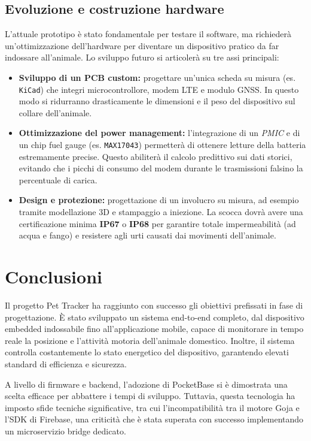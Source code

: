 \documentclass[12pt,a4paper]{article}
\begin{document}
\subsection{Evoluzione e costruzione hardware}
L’attuale prototipo è stato fondamentale per testare il software, ma richiederà un'ottimizzazione dell'hardware per diventare un dispositivo pratico da far indossare all'animale. Lo sviluppo futuro si articolerà su tre assi principali:
\begin{itemize}
    \item \textbf{Sviluppo di un PCB custom:} progettare un'unica scheda su misura (es. \texttt{KiCad}) che integri microcontrollore, modem LTE e modulo GNSS. In questo modo si ridurranno drasticamente le dimensioni e il peso del dispositivo sul collare dell'animale.
    \item \textbf{Ottimizzazione del power management:} l'integrazione di un \textit{PMIC} e di un chip fuel gauge (es. \texttt{MAX17043}) permetterà di ottenere letture della batteria estremamente precise. Questo abiliterà il calcolo predittivo sui dati storici, evitando che i picchi di consumo del modem durante le trasmissioni falsino la percentuale di carica.
    \item \textbf{Design e protezione:} progettazione di un involucro su misura, ad esempio tramite modellazione 3D e stampaggio a iniezione. La scocca dovrà avere una certificazione minima \textbf{IP67} o \textbf{IP68} per garantire totale impermeabilità (ad acqua e fango) e resistere agli urti causati dai movimenti dell'animale.
\end{itemize}

\newpage

\section{Conclusioni}
Il progetto Pet Tracker ha raggiunto con successo gli obiettivi prefissati in fase di progettazione. È stato sviluppato un sistema end-to-end completo, dal dispositivo embedded indossabile fino all'applicazione mobile, capace di monitorare in tempo reale la posizione e l'attività motoria dell'animale domestico. Inoltre, il sistema controlla costantemente lo stato energetico del dispositivo, garantendo elevati standard di efficienza e sicurezza.

A livello di firmware e backend, l'adozione di PocketBase si è dimostrata una scelta efficace per abbattere i tempi di sviluppo. Tuttavia, questa tecnologia ha imposto sfide tecniche significative, tra cui l'incompatibilità tra il motore Goja e l'SDK di Firebase, una criticità che è stata superata con successo implementando un microservizio bridge dedicato.
\end{document}
